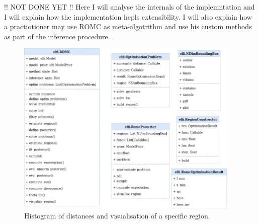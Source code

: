 !! NOT DONE YET !! Here I will analyse the internals of the implemntation and I will explain how the implementation hepls extensibility. I will also explain how a practiotioner may use ROMC as meta-algotrithm and use his custom methods as part of the inference procedure.

\begin{figure}[h]
    \begin{center}
      \includegraphics[width=0.95\textwidth]{./Thesis/graphs/RomcEntityDiagram.png}
    \end{center}
  \caption{Histogram of distances and visualisation of a specific region.}
  \label{fig:example_training}
\end{figure}